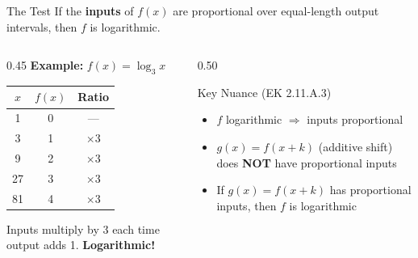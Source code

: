 \documentclass[aspectratio=169, 11pt]{beamer}
\begin{document}
\begin{frame}[t, plain]

  \begin{block}{The Test}
    If the \textbf{inputs} of $f(x)$ are proportional over equal-length output intervals,
    then $f$ is logarithmic.
  \end{block}

  \vspace{0.25cm}
  \begin{columns}[T]
    \begin{column}{0.45\textwidth}
      \textbf{Example:} $f(x) = \log_3 x$

      \vspace{0.15cm}
      \begin{tabular}{|c|c|c|}
        \hline
        \textbf{$x$} & \textbf{$f(x)$} & \textbf{Ratio} \\
        \hline
        1  & 0 & --- \\
        3  & 1 & $\times 3$ \\
        9  & 2 & $\times 3$ \\
        27 & 3 & $\times 3$ \\
        81 & 4 & $\times 3$ \\
        \hline
      \end{tabular}

      \vspace{0.1cm}
      \small Inputs multiply by 3 each time output adds 1. \;\textbf{Logarithmic!}
    \end{column}
    \begin{column}{0.50\textwidth}
      \begin{block}{Key Nuance (EK 2.11.A.3)}
        \begin{itemize}
          \setlength{\itemsep}{7pt}
          \item $f$ logarithmic $\Rightarrow$ inputs proportional
          \item $g(x) = f(x+k)$ (additive shift) does \textbf{NOT} have proportional inputs
          \item If $g(x) = f(x+k)$ has proportional inputs, then $f$ is logarithmic
        \end{itemize}
      \end{block}
    \end{column}
  \end{columns}
\end{frame}
\end{document}
